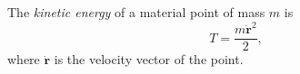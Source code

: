 The \textit{kinetic energy} of a material point of mass $m$ is
$$T = \frac{m \dot{\mathbf{r}}^2}{2},$$
where $\dot{\mathbf{r}}$ is the velocity vector of the point.
